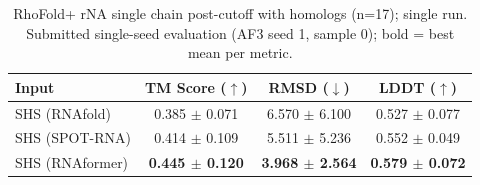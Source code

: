 \begin{table}[htbp]
\centering
\caption{RhoFold+ rNA single chain post-cutoff with homologs (n=17); single run. Submitted single-seed evaluation (AF3 seed 1, sample 0); bold = best mean per metric.}
\label{tab:rf_rna_single_chain_post_cutoff_with_homologs}
\begin{tabular}{lccc}
\toprule
Input & TM Score ($\uparrow$) & RMSD ($\downarrow$) & LDDT ($\uparrow$) \\
\midrule
SHS (RNAfold) & 0.385 $\pm$ 0.071 & 6.570 $\pm$ 6.100 & 0.527 $\pm$ 0.077 \\
SHS (SPOT-RNA) & 0.414 $\pm$ 0.109 & 5.511 $\pm$ 5.236 & 0.552 $\pm$ 0.049 \\
SHS (RNAformer) & \textbf{0.445 $\pm$ 0.120} & \textbf{3.968 $\pm$ 2.564} & \textbf{0.579 $\pm$ 0.072} \\
\bottomrule
\end{tabular}
\end{table}
